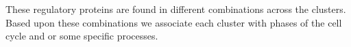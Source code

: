 \documentclass[]{article}
\begin{document}
%
%
%
%
%
%

 

These regulatory proteins are found in different combinations across the clusters. Based upon these combinations we associate each cluster with phases of the cell cycle and or some specific processes.
\end{document}
